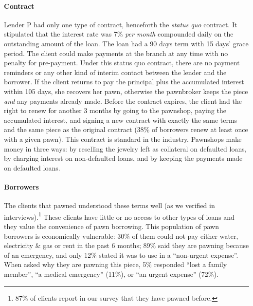 \documentclass[12pt, a4paper]{article}
\begin{document}
\paragraph*{Contract} Lender P had only one type of contract, henceforth the \textit{status quo} contract. It stipulated that the interest rate was 7\% \textit{per month} compounded daily on the outstanding amount of the loan. The loan had a 90 days term with 15 days' grace period. The client could make payments at the branch at any time with no penalty for pre-payment. Under this status quo contract, there are no payment reminders or any other kind of interim contact between the lender and the borrower. If the client returns to pay the principal plus the accumulated interest within 105 days, she recovers her pawn, otherwise the pawnbroker keeps the piece \textit{and} any payments already made. Before the contract expires, the client had the right to renew for another 3 months by going to the pawnshop, paying the accumulated interest, and signing a new contract with exactly the same terms and the same piece as the original contract (38\% of borrowers renew at least once with a given pawn). This contract is standard in the industry.  Pawnshops make money in three ways: by reselling the jewelry left as collateral on defaulted loans, by charging interest on non-defaulted loans, and by keeping the payments made on defaulted loans. 

\paragraph*{Borrowers} The clients that pawned understood these terms well (as we verified in interviews).\footnote{87\% of clients report in our survey that they have pawned before.} These clients have little or no access to other types of loans and they value the convenience of pawn borrowing.  This population of pawn borrowers is economically vulnerable:  30\% of them could not pay either water, electricity \& gas or rent in the past 6 months; 89\% said they are pawning because of an emergency, and only 12\% stated it was to use in a ``non-urgent expense''.  When asked why they are pawning this piece, 5\% responded ``lost a family member'', ``a medical emergency'' (11\%), or ``an urgent expense'' (72\%).

\end{document}
